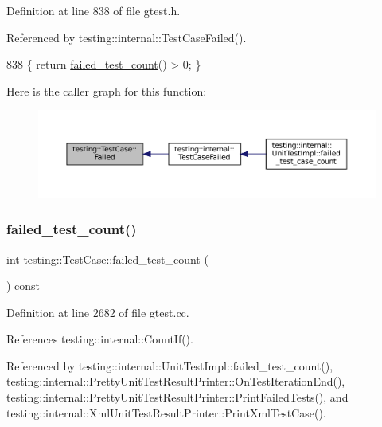 Definition at line 838 of file gtest.\+h.



Referenced by testing\+::internal\+::\+Test\+Case\+Failed().


\begin{DoxyCode}
838 \{ \textcolor{keywordflow}{return} \hyperlink{classtesting_1_1TestCase_a70e26eb070c75ae62a191fa610ea234f}{failed\_test\_count}() > 0; \}
\end{DoxyCode}
Here is the caller graph for this function\+:
\nopagebreak
\begin{figure}[H]
\begin{center}
\leavevmode
\includegraphics[width=350pt]{classtesting_1_1TestCase_ae71c30eab6f1673b82090a0e745c2aa5_icgraph}
\end{center}
\end{figure}
\mbox{\label{classtesting_1_1TestCase_a70e26eb070c75ae62a191fa610ea234f}} 
\subsubsection{\texorpdfstring{failed\+\_\+test\+\_\+count()}{failed\_test\_count()}}
{\footnotesize\ttfamily int testing\+::\+Test\+Case\+::failed\+\_\+test\+\_\+count (\begin{DoxyParamCaption}{ }\end{DoxyParamCaption}) const}



Definition at line 2682 of file gtest.\+cc.



References testing\+::internal\+::\+Count\+If().



Referenced by testing\+::internal\+::\+Unit\+Test\+Impl\+::failed\+\_\+test\+\_\+count(), testing\+::internal\+::\+Pretty\+Unit\+Test\+Result\+Printer\+::\+On\+Test\+Iteration\+End(), testing\+::internal\+::\+Pretty\+Unit\+Test\+Result\+Printer\+::\+Print\+Failed\+Tests(), and testing\+::internal\+::\+Xml\+Unit\+Test\+Result\+Printer\+::\+Print\+Xml\+Test\+Case().


